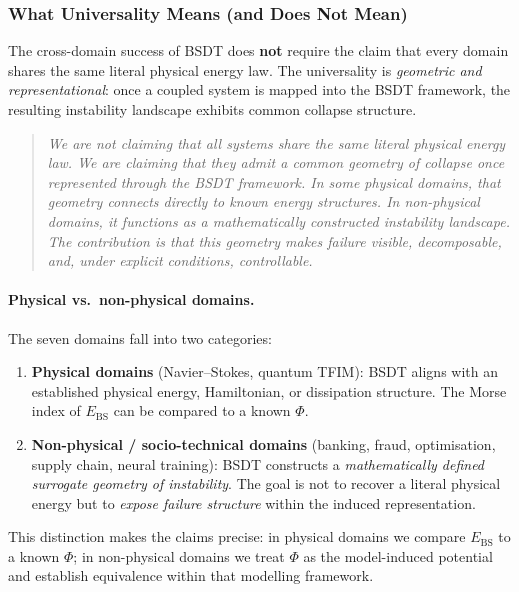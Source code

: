 \documentclass[11pt,a4paper]{article}
\newcommand{\Ebs}{E_{\mathrm{BS}}}
\begin{document}
\subsubsection{What Universality Means (and Does Not Mean)}

The cross-domain success of BSDT does \textbf{not} require the
claim that every domain shares the same literal physical energy
law.  The universality is \emph{geometric and representational}:
once a coupled system is mapped into the BSDT framework, the
resulting instability landscape exhibits common collapse structure.

\begin{quote}
\emph{We are not claiming that all systems share the same literal
physical energy law.  We are claiming that they admit a common
geometry of collapse once represented through the BSDT framework.
In some physical domains, that geometry connects directly to known
energy structures.  In non-physical domains, it functions as a
mathematically constructed instability landscape.  The contribution
is that this geometry makes failure visible, decomposable, and,
under explicit conditions, controllable.}
\end{quote}

\paragraph{Physical vs.\ non-physical domains.}
The seven domains fall into two categories:

\begin{enumerate}[nosep]
  \item \textbf{Physical domains} (Navier--Stokes,
    quantum TFIM): BSDT aligns with an established physical
    energy, Hamiltonian, or dissipation structure.  The Morse
    index of $\Ebs$ can be compared to a known $\Phi$.
  \item \textbf{Non-physical / socio-technical domains}
    (banking, fraud, optimisation, supply chain, neural
    training): BSDT constructs a \emph{mathematically defined
    surrogate geometry of instability}.  The goal is not to
    recover a literal physical energy but to \emph{expose
    failure structure} within the induced representation.
\end{enumerate}

\noindent
This distinction makes the claims precise: in physical domains
we compare $\Ebs$ to a known $\Phi$; in non-physical domains
we treat $\Phi$ as the model-induced potential and establish
equivalence within that modelling framework.
\end{document}
